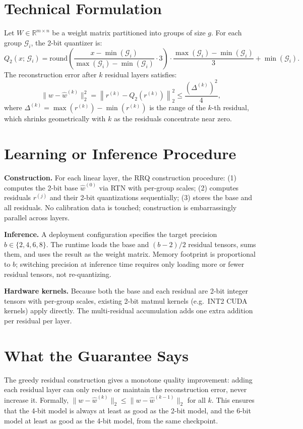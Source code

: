 \documentclass[10pt,twocolumn]{article}
\begin{document}
\section{Technical Formulation}

Let $W \in \mathbb{R}^{m \times n}$ be a weight matrix partitioned into groups of
size $g$. For each group $\mathcal{G}_i$, the 2-bit quantizer is:
\[
Q_2(x;\,\mathcal{G}_i) = \mathrm{round}\!\left(
  \frac{x - \min(\mathcal{G}_i)}{\max(\mathcal{G}_i) - \min(\mathcal{G}_i)} \cdot 3
\right) \cdot \frac{\max(\mathcal{G}_i) - \min(\mathcal{G}_i)}{3}
+ \min(\mathcal{G}_i).
\]
The reconstruction error after $k$ residual layers satisfies:
\[
\|w - \hat{w}^{(k)}\|_2^2
= \left\|r^{(k)} - Q_2(r^{(k)})\right\|_2^2
\leq \frac{(\Delta^{(k)})^2}{4},
\]
where $\Delta^{(k)} = \max(r^{(k)}) - \min(r^{(k)})$ is the range of the $k$-th
residual, which shrinks geometrically with $k$ as the residuals concentrate near zero.

\section{Learning or Inference Procedure}

\textbf{Construction.}
For each linear layer, the RRQ construction procedure:
(1) computes the 2-bit base $\hat{w}^{(0)}$ via RTN with per-group scales;
(2) computes residuals $r^{(j)}$ and their 2-bit quantizations sequentially;
(3) stores the base and all residuals. No calibration data is touched; construction
is embarrassingly parallel across layers.

\textbf{Inference.}
A deployment configuration specifies the target precision $b \in \{2, 4, 6, 8\}$.
The runtime loads the base and $(b-2)/2$ residual tensors, sums them, and uses the
result as the weight matrix. Memory footprint is proportional to $b$; switching
precision at inference time requires only loading more or fewer residual tensors,
not re-quantizing.

\textbf{Hardware kernels.}
Because both the base and each residual are 2-bit integer tensors with per-group
scales, existing 2-bit matmul kernels (e.g.\ INT2 CUDA kernels) apply directly.
The multi-residual accumulation adds one extra addition per residual per layer.

\section{What the Guarantee Says}

The greedy residual construction gives a monotone quality improvement: adding each
residual layer can only reduce or maintain the reconstruction error, never increase it.
Formally, $\|w - \hat{w}^{(k)}\|_2 \leq \|w - \hat{w}^{(k-1)}\|_2$ for all $k$.
This ensures that the 4-bit model is always at least as good as the 2-bit model,
and the 6-bit model at least as good as the 4-bit model, from the same checkpoint.
\end{document}
